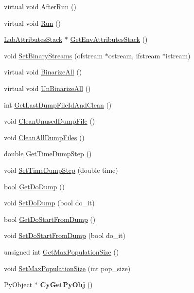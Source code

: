 \begin{DoxyCompactItemize}
\item 
virtual void \hyperlink{classelps_1_1_lab_simulator_base_afbd964545df8788fe65a488e731a7d05}{After\+Run} ()
\item 
virtual void \hyperlink{classelps_1_1_lab_simulator_base_a976cbd225a24cb9c327c960fcea0df63}{Run} ()
\item 
\hyperlink{classelps_1_1_lab_attributes_stack}{Lab\+Attributes\+Stack} $\ast$ \hyperlink{classelps_1_1_lab_simulator_base_a1fc6fe479fa4c942fa0d46b349679ce6}{Get\+Env\+Attributes\+Stack} ()
\item 
void \hyperlink{classelps_1_1_lab_simulator_base_a1523f0d57763742aaaf1b2222caae46f}{Set\+Binary\+Streams} (ofstream $\ast$ostream, ifstream $\ast$istream)
\item 
virtual void \hyperlink{classelps_1_1_lab_simulator_base_ada8b1bb899da72df3677649a2732c31e}{Binarize\+All} ()
\item 
virtual void \hyperlink{classelps_1_1_lab_simulator_base_aab7881a148c2f3859c19ff311d2b5e49}{Un\+Binarize\+All} ()
\item 
int \hyperlink{classelps_1_1_lab_simulator_base_a3b36b0fcefab88319fb92533399ba508}{Get\+Last\+Dump\+File\+Id\+And\+Clean} ()
\item 
void \hyperlink{classelps_1_1_lab_simulator_base_ae40e1b9c3113be0629fe78a6e64ebbeb}{Clean\+Unused\+Dump\+File} ()
\item 
void \hyperlink{classelps_1_1_lab_simulator_base_af3b8fab0726ba0a17469486315ccc457}{Clean\+All\+Dump\+Files} ()
\item 
double \hyperlink{classelps_1_1_lab_simulator_base_a9ca089a13b72ce8dc44be9672a09cce4}{Get\+Time\+Dump\+Step} ()
\item 
void \hyperlink{classelps_1_1_lab_simulator_base_a1728d3db698c0557b39ca7246ff749ea}{Set\+Time\+Dump\+Step} (double time)
\item 
bool \hyperlink{classelps_1_1_lab_simulator_base_a001a3c283b3e5e662fe495e5431d4614}{Get\+Do\+Dump} ()
\item 
void \hyperlink{classelps_1_1_lab_simulator_base_a848eedee34bf452deb5e29cd2a76d132}{Set\+Do\+Dump} (bool do\+\_\+it)
\item 
bool \hyperlink{classelps_1_1_lab_simulator_base_afed6057d37890c06c368e0f1c8386151}{Get\+Do\+Start\+From\+Dump} ()
\item 
void \hyperlink{classelps_1_1_lab_simulator_base_a0d917416e0b955e991ebb2da2c283763}{Set\+Do\+Start\+From\+Dump} (bool do\+\_\+it)
\item 
unsigned int \hyperlink{classelps_1_1_lab_simulator_base_a009b34ef7699895bc858bfe5dd4549cb}{Get\+Max\+Population\+Size} ()
\item 
void \hyperlink{classelps_1_1_lab_simulator_base_a69c26fc0a20da366265fe86c292cc7e1}{Set\+Max\+Population\+Size} (int pop\+\_\+size)
\item 
\hypertarget{classelps_1_1_lab_simulator_base_a8e8ebc73198cfdcbdd0e063ddee37b8b}{Py\+Object $\ast$ {\bfseries Cy\+Get\+Py\+Obj} ()}\label{classelps_1_1_lab_simulator_base_a8e8ebc73198cfdcbdd0e063ddee37b8b}


\end{DoxyCompactItemize}
